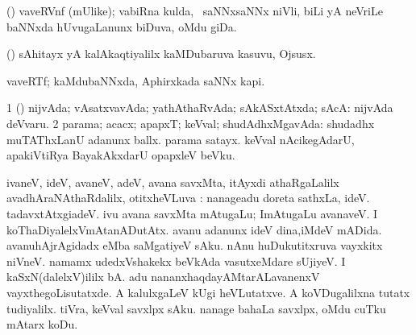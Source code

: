 {{{{\bentry
{} 
\gl{\nA}
\expl{}
\bmng
\emng
\eentry

\bentry
{} 
\gl{\nA}
\expl{}
\bmng
 (\savi) vaveRVnf (mUlike); vabiRna kulda, \kanmu\ saNNxsaNNx niVli, biLi yA neVriLe baNNxda hUvugaLanunx biDuva, oMdu giDa. 
\emng
\eentry

\bentry
{} 
\gl{\nA}
\expl{}
\bmng
 (\kanmu) sAhitayx yA kalAkaqtiyalilx kaMDubaruva kasuvu, Ojsusx. 
\emng
\eentry

\bentry
{} 
\gl{\nA}
\expl{}
\bmng
 vaveRTf; kaMdubaNNxda, Aphirxkada saNNx kapi. 
\emng
\eentry

\bentry
{} 
\gl{\gu}
\expl{}
\bmng
\bnum
\num{1} (\pArxparx) nijvAda; vAsatxvavAda; yathAthaRvAda; sAkASxtAtxda; sAcA:  nijvAda deVvaru. 
\num{2} parama; acacx; apapxT; keVval; shudAdhxMgavAda:  shudadhx muTAThxLanU adanunx ballx.  parama satayx.  keVval nAcikegAdarU, apakiVtiRya BayakAkxdarU opapxleV beVku. 
\enum
\emng

\noindent
\gl{\pagu}
\expl{}
 ivaneV, ideV, avaneV, adeV, avana savxMta, itAyxdi athaRgaLalilx avadhAraNAthaRdalilx, otitxheVLuva \parx :  nanageadu doreta sathxLa, ideV.  tadavxtAtxgiadeV.  ivu avana savxMta mAtugaLu; ImAtugaLu avanaveV.  I koThaDiyalelxVmAtanADutAtx.  avanu adanunx ideV dina,iMdeV mADida.  avanuhAjrAgidadx eMba saMgatiyeV sAku.  nAnu huDukutitxruva vayxkitx niVneV.  namamx udedxVshakekx beVkAda vasutxeMdare sUjiyeV.  I kaSxN(dalelxV)ililx bA.  adu nananxhaqdayAMtarALavanenxV vayxthegoLisutatxde.  A kalulxgaLeV kUgi heVLutatxve.  A koVDugalilxna tutatx tudiyalilx.  tiVra, keVval savxlpx sAku. nanage bahaLa savxlpx, oMdu cuTku mAtarx koDu. \eentry

}}}}
